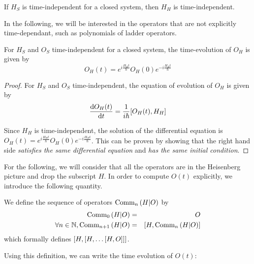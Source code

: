 \begin{corollary}
    If $H_S$ is time-independent for a closed system, then $H_H$ is time-independent.
\end{corollary}

In the following, we will be interested in the operators that are not explicitly time-dependant, such as polynomials of ladder operators.

\begin{theorem}
    For $H_S$ and $O_S$ time-independent for a closed system, the time-evolution of $O_H$ is given by
    \begin{equation}
        O_H(t) = e^{i\frac{H_H t}{\hbar}} O_H(0) e^{-i\frac{H_H t}{\hbar}}
    \end{equation}
\end{theorem}

\begin{proof}
    For $H_S$ and $O_S$ time-independent, the equation of evolution of $O_H$ is given by
    \begin{equation} \label{equa-diff-closed}
        \timeDeriv{O_H(t)} = \ihbar \commutator{O_H(t)}{H_H}
    \end{equation}

    Since $H_H$ is time-independent, the solution of the differential equation is $O_H(t) = e^{i\frac{H_H t}{\hbar}} O_H(0) e^{-i\frac{H_H t}{\hbar}}$. This can be proven by showing that the right hand side \textit{satisfies the same differential equation} and \textit{has the same initial condition}.
\end{proof}

For the following, we will consider that all the operators are in the Heisenberg picture and drop the subscript $H$. In order to compute $O(t)$ explicitly, we introduce the following quantity.

\begin{definition}
    We define the sequence of operators $\text{Comm}_{n}\left(H | O\right)$ by
    \begin{eqnarray}
        \Comm{0}{H}{O} &=& O\\
        \forall n \in \mathbb{N}, \Comm{n+1}{H}{O} &=& \commutator{H}{\Comm{n}{H}{O}}
    \end{eqnarray}
    which formally defines $\commutator{H}{\commutator{H}{\ldots\commutator{H}{O}}}$.
\end{definition}

Using this definition, we can write the time evolution of $O(t)$:

